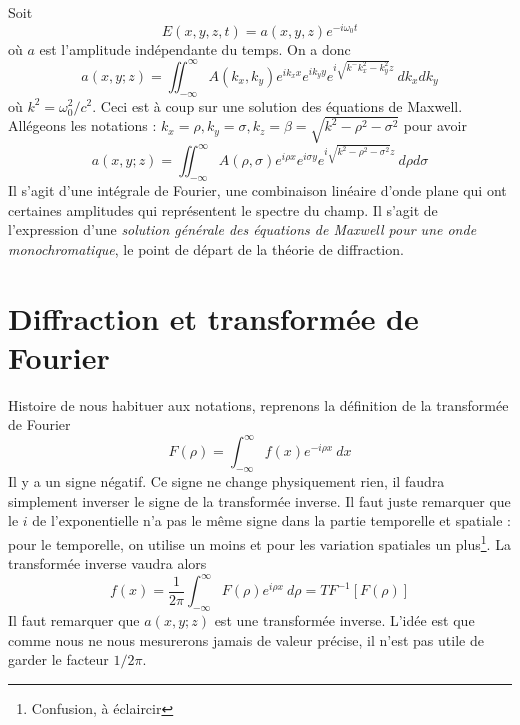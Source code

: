 Soit 
\begin{equation}
E(x,y,z,t) = a(x,y,z)e^{-i\omega_0t}
\end{equation}
où $a$ est l'amplitude indépendante du temps. On a donc
\begin{equation}
a(x,y;z) = \iint_{-\infty}^\infty A(k_x,k_y) e^{ik_xx}e^{ik_yy}e^{i 
\sqrt{k^-k_x^2-k_y^2} z}\ dk_xdk_y
\end{equation}
où $k^2 = \omega_0^2/c^2$. Ceci est à coup sur une solution des équations de Maxwell. Allégeons 
les notations : $k_x=\rho, k_y=\sigma, k_z=\beta=\sqrt{k^2-\rho^2-\sigma^2}$ pour avoir
\begin{equation}
a(x,y;z) = \iint_{-\infty}^\infty A(\rho,\sigma)e^{i\rho x}e^{i\sigma y} e^{i\sqrt{k^2-\rho^2-
\sigma^2}z}\ d\rho d\sigma
\end{equation}
Il s'agit d'une intégrale de Fourier, une combinaison linéaire d'onde plane qui ont certaines 
amplitudes qui représentent le spectre du champ. Il s'agit de l'expression d'une \textit{solution 
générale des équations de Maxwell pour une onde monochromatique}, le point de départ de la 
théorie de diffraction.


\newpage
\section{Diffraction et transformée de Fourier}
Histoire de nous habituer aux notations, reprenons la définition de la transformée de Fourier
\begin{equation}
F(\rho) = \int_{-\infty}^\infty f(x)e^{-i\rho x}\ dx
\end{equation}
\danger Il y a un signe négatif. Ce signe ne change physiquement rien, il faudra simplement 
inverser le signe de la transformée inverse. Il faut juste remarquer que le $i$ de l'exponentielle 
n'a pas le même signe dans la partie temporelle et spatiale : pour le temporelle, on utilise un 
moins et pour les variation spatiales un plus\footnote{Confusion, à éclaircir}. La transformée 
inverse vaudra alors
\begin{equation}
f(x) = \dfrac{1}{2\pi}\int_{-\infty}^\infty F(\rho)e^{i\rho x}\ d\rho = TF^{-1}[F(\rho)]
\end{equation}
Il faut remarquer que $a(x,y;z)$ est une transformée inverse. L'idée est que comme nous ne nous 
mesurerons jamais de valeur précise, il n'est pas utile de garder le facteur $1/2\pi$.\\

